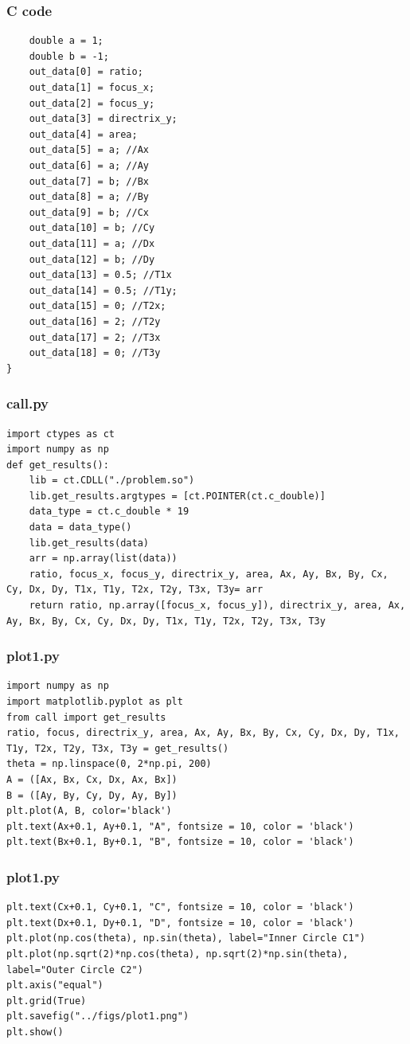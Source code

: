 \documentclass{beamer}
\begin{document}
\begin{frame}[fragile]
    \frametitle{C code}
    \begin{lstlisting}
    double a = 1;
    double b = -1;
    out_data[0] = ratio;
    out_data[1] = focus_x;
    out_data[2] = focus_y;
    out_data[3] = directrix_y;
    out_data[4] = area;
    out_data[5] = a; //Ax
    out_data[6] = a; //Ay
    out_data[7] = b; //Bx
    out_data[8] = a; //By
    out_data[9] = b; //Cx
    out_data[10] = b; //Cy
    out_data[11] = a; //Dx
    out_data[12] = b; //Dy
    out_data[13] = 0.5; //T1x
    out_data[14] = 0.5; //T1y;
    out_data[15] = 0; //T2x;
    out_data[16] = 2; //T2y
    out_data[17] = 2; //T3x
    out_data[18] = 0; //T3y 
}
    \end{lstlisting}
\end{frame}

\begin{frame}[fragile]
    \frametitle{call.py}
    \begin{lstlisting}
import ctypes as ct
import numpy as np
def get_results():
    lib = ct.CDLL("./problem.so")
    lib.get_results.argtypes = [ct.POINTER(ct.c_double)]
    data_type = ct.c_double * 19
    data = data_type()
    lib.get_results(data)
    arr = np.array(list(data))
    ratio, focus_x, focus_y, directrix_y, area, Ax, Ay, Bx, By, Cx, Cy, Dx, Dy, T1x, T1y, T2x, T2y, T3x, T3y= arr
    return ratio, np.array([focus_x, focus_y]), directrix_y, area, Ax, Ay, Bx, By, Cx, Cy, Dx, Dy, T1x, T1y, T2x, T2y, T3x, T3y
    \end{lstlisting}
\end{frame}

\begin{frame}[fragile]
    \frametitle{plot1.py}
    \begin{lstlisting}
import numpy as np
import matplotlib.pyplot as plt
from call import get_results
ratio, focus, directrix_y, area, Ax, Ay, Bx, By, Cx, Cy, Dx, Dy, T1x, T1y, T2x, T2y, T3x, T3y = get_results()
theta = np.linspace(0, 2*np.pi, 200)
A = ([Ax, Bx, Cx, Dx, Ax, Bx])
B = ([Ay, By, Cy, Dy, Ay, By])
plt.plot(A, B, color='black')
plt.text(Ax+0.1, Ay+0.1, "A", fontsize = 10, color = 'black')
plt.text(Bx+0.1, By+0.1, "B", fontsize = 10, color = 'black')
    \end{lstlisting}
\end{frame}

\begin{frame}[fragile]
    \frametitle{plot1.py}
    \begin{lstlisting}
plt.text(Cx+0.1, Cy+0.1, "C", fontsize = 10, color = 'black')
plt.text(Dx+0.1, Dy+0.1, "D", fontsize = 10, color = 'black')
plt.plot(np.cos(theta), np.sin(theta), label="Inner Circle C1")
plt.plot(np.sqrt(2)*np.cos(theta), np.sqrt(2)*np.sin(theta), label="Outer Circle C2")
plt.axis("equal")
plt.grid(True)
plt.savefig("../figs/plot1.png")
plt.show()
    \end{lstlisting}
\end{frame}
\end{document}
